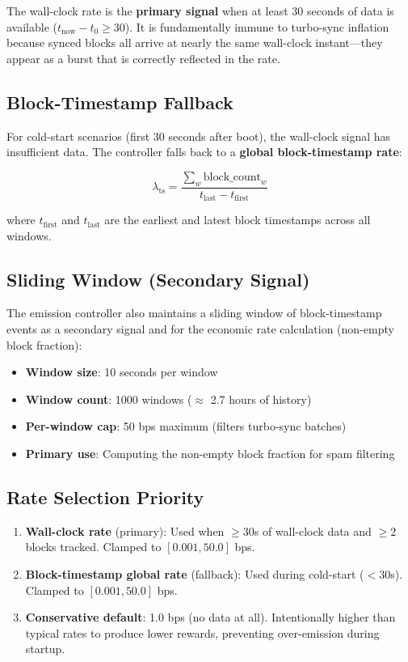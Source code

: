 \documentclass[11pt,a4paper]{article}
\begin{document}
The wall-clock rate is the \textbf{primary signal} when at least 30 seconds of data is available ($t_{\text{now}} - t_0 \geq 30$). It is fundamentally immune to turbo-sync inflation because synced blocks all arrive at nearly the same wall-clock instant---they appear as a burst that is correctly reflected in the rate.

\subsection{Block-Timestamp Fallback}

For cold-start scenarios (first 30 seconds after boot), the wall-clock signal has insufficient data. The controller falls back to a \textbf{global block-timestamp rate}:

\begin{equation}
    \lambda_{\text{ts}} = \frac{\sum_w \text{block\_count}_w}{t_{\text{last}} - t_{\text{first}}}
\end{equation}

where $t_{\text{first}}$ and $t_{\text{last}}$ are the earliest and latest block timestamps across all windows.

\subsection{Sliding Window (Secondary Signal)}

The emission controller also maintains a sliding window of block-timestamp events as a secondary signal and for the economic rate calculation (non-empty block fraction):

\begin{itemize}
    \item \textbf{Window size}: 10 seconds per window
    \item \textbf{Window count}: 1000 windows ($\approx$ 2.7 hours of history)
    \item \textbf{Per-window cap}: 50 bps maximum (filters turbo-sync batches)
    \item \textbf{Primary use}: Computing the non-empty block fraction for spam filtering
\end{itemize}

\subsection{Rate Selection Priority}

\begin{enumerate}
    \item \textbf{Wall-clock rate} (primary): Used when $\geq 30$s of wall-clock data and $\geq 2$ blocks tracked. Clamped to $[0.001, 50.0]$ bps.
    \item \textbf{Block-timestamp global rate} (fallback): Used during cold-start ($< 30$s). Clamped to $[0.001, 50.0]$ bps.
    \item \textbf{Conservative default}: 1.0 bps (no data at all). Intentionally higher than typical rates to produce lower rewards, preventing over-emission during startup.
\end{enumerate}
\end{document}
